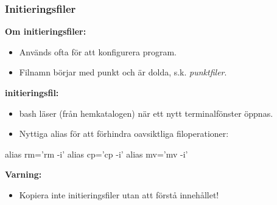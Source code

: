 



\begin{frame}[fragile=singleslide]
    \frametitle{Initieringsfiler}

    \textbf{Om initieringsfiler:}
    \begin{itemize}
        \item Används ofta för att konfigurera program.
        \item Filnamn börjar med punkt och är dolda, s.k. \emph{punktfiler}.
    \end{itemize}
    
    \textbf{ initieringsfil:}
    \begin{itemize}
        \item bash läser  (från hemkatalogen) när ett nytt terminalfönster öppnas.
        \item Nyttiga alias för att förhindra oavsiktliga filoperationer:
    \end{itemize}

    \begin{Code}
        alias rm='rm -i'
        alias cp='cp -i'
        alias mv='mv -i'
    \end{Code}

    \textbf{Varning:}
    \begin{itemize}
        \item Kopiera inte initieringsfiler utan att förstå innehållet!
    \end{itemize}

\end{frame}


